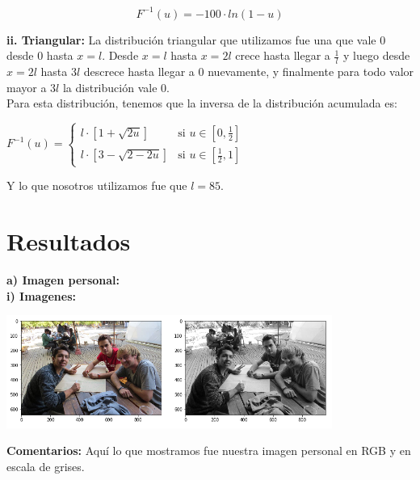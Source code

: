 \documentclass[11pt]{article}
\begin{document}
\[ F^{-1}(u) = - 100 \cdot ln(1-u) \]

\newpage

\textbf{ii. Triangular:} La distribución triangular que utilizamos fue una que vale $ 0 $ desde $0$ hasta $ x = l $. Desde $ x = l $ hasta $ x = 2l $ crece hasta llegar a $ \frac{1}{l} $ y luego desde $ x = 2l $ hasta $ 3l $ descrece hasta llegar a $0$ nuevamente, y finalmente para todo valor mayor a $ 3l $ la distribución vale $0$. \\

Para esta distribución, tenemos que la inversa de la distribución acumulada es:

\begin{center}

$   F^{-1}(u) = 
   \begin{cases} 
      l \cdot [1 + \sqrt{2u}]              & \mbox{si } u \in \left[0, \frac{1}{2} \right]   \\
      l \cdot [3 - \sqrt{2-2u}] & \mbox{si } u \in \left[ \frac{1}{2}, 1 \right]
   \end{cases} $

\end{center}

Y lo que nosotros utilizamos fue que $ l = 85 $. \\

\section{Resultados}

\textbf{a) Imagen personal:} \\

\textbf{i) Imagenes:}

\begin{center}
\includegraphics[width=0.8\textwidth]{./figures/beto_normal}
\end{center}

\textbf{Comentarios:} Aquí lo que mostramos fue nuestra imagen personal en RGB y en escala de grises. \\

$ \ $ 
\end{document}
